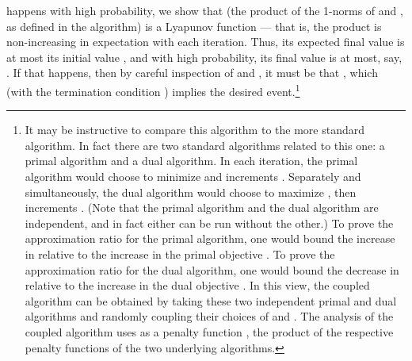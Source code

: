 \documentclass[11pt]{svjour3} \usepackage{fullpage}
\begin{document}
happens with high probability,
we show that   (the product of the 1-norms of  and ,
as defined in the algorithm) is a Lyapunov function --- that is, the product  is non-increasing in expectation with each iteration.
Thus, its expected final value is at most its initial value ,
and with high probability, its final value is at most, say, .
If that happens, then by careful inspection of  and ,
it must be that ,
which (with the termination condition ) implies the desired event.\footnote
{It may be instructive to compare this algorithm to the more standard algorithm.
In fact there are two standard algorithms related to this one: a primal algorithm and a dual algorithm.
In each iteration, the primal algorithm would choose  to minimize 
and increments .
Separately and simultaneously, the dual algorithm would choose  to maximize ,
then increments .
(Note that the primal algorithm and the dual algorithm are independent,
and in fact either can be run without the other.)
To prove the approximation ratio for the primal algorithm, one would bound the increase in  relative to the increase in the primal objective .
To prove the approximation ratio for the dual algorithm, one would bound the decrease in  relative to the increase in the dual objective .
In this view, the coupled algorithm can be obtained by taking these two independent primal and dual algorithms
and randomly coupling their choices of  and .
The analysis of the coupled algorithm uses as a penalty function ,
the product of the respective penalty functions  of the two underlying algorithms.
}
\end{document}
